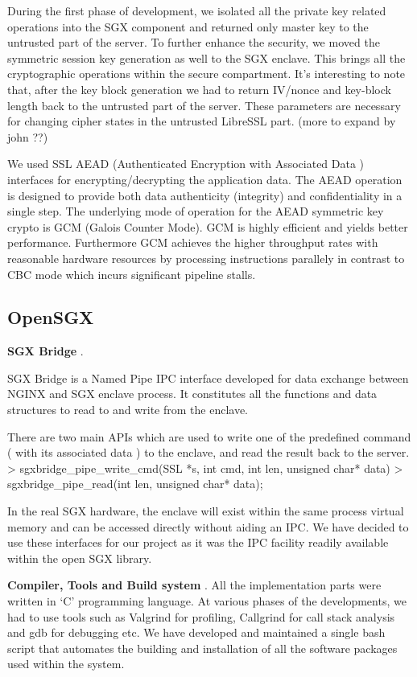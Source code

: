 \documentclass[../main.tex]{subfiles}
\begin{document}
During the first phase of development, we isolated all the private key related operations into the SGX component and returned only master key to the untrusted part of the server. To further enhance the security, we moved the symmetric session key generation as well to the SGX enclave.  This brings all the cryptographic operations within the secure compartment. It’s interesting to note that, after the key block generation we had to return IV/nonce and key-block length back to the untrusted part of the server. These parameters are necessary for changing cipher states in the untrusted LibreSSL part.  (more to expand by john ??)

We used SSL AEAD (Authenticated Encryption with Associated Data ) interfaces for encrypting/decrypting the application data. The AEAD operation is designed to provide both data authenticity (integrity) and confidentiality in a single step. The  underlying mode of operation for the AEAD symmetric key crypto is GCM (Galois Counter Mode). GCM is highly efficient and yields better performance. Furthermore GCM achieves the higher throughput rates with reasonable hardware resources by processing instructions parallely in contrast to CBC mode which incurs significant pipeline stalls.

\subsection{OpenSGX}
\label{sec:opensgx}

\textbf{SGX Bridge }.

SGX Bridge is a Named Pipe IPC interface developed for data exchange between NGINX and SGX enclave process. It constitutes all the functions and data structures to read to and write from the enclave. 

There are two main APIs which are used to write one of the predefined command ( with its  associated data ) to the enclave, and read the result back to the server. 
> sgxbridge\_pipe\_write\_cmd(SSL *s, int cmd, int len, unsigned char* data)
> sgxbridge\_pipe\_read(int len, unsigned char* data);

In the real SGX hardware, the enclave will exist within the same process virtual memory and can be accessed directly without aiding an IPC. We have decided to use these interfaces for our project as it was the IPC facility readily available within the open SGX library. 

\textbf{Compiler, Tools and Build system }.
All the implementation parts were written in ‘C’ programming language. 
At various phases of the developments, we had to use tools such as Valgrind for profiling, Callgrind for call stack analysis and gdb for debugging etc. We have developed and maintained a single bash script that automates the building and installation of  all the software packages used within the system. 
\end{document}
